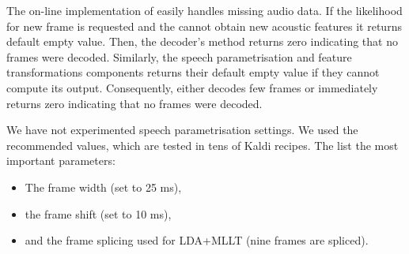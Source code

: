 The on-line implementation  of  easily handles missing audio data.
If the likelihood for new frame is requested and the  cannot obtain new acoustic features it returns default empty value.
Then, the decoder's method  returns zero indicating that no frames were decoded.
Similarly, the speech parametrisation and feature transformations components returns their default empty value if they cannot compute its output.
Consequently,  either decodes few frames or immediately returns zero indicating that no frames were decoded.

We have not experimented speech parametrisation settings. 
We used the recommended values, which are tested in tens of Kaldi recipes.
The list the most important parameters:
\begin{itemize}
    \item The frame width (set to 25 ms), 
    \item the frame shift (set to 10 ms), 
    \item and the frame splicing used for \ac{LDA}+\ac{MLLT} (nine frames are spliced).
\end{itemize}



